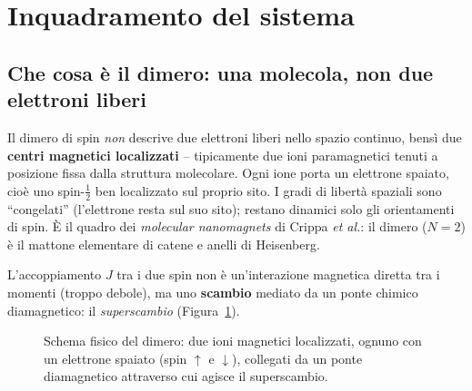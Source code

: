 \documentclass[11pt,a4paper]{article}
\newcommand{\up}{\uparrow}
\newcommand{\dn}{\downarrow}
\theoremstyle{definition}
\theoremstyle{remark}
\newcommand{\arrowup}[2]{\draw[spinup,line width=1.2pt,-{Stealth[length=2.4mm,width=2mm]}] (#1,{#2-0.22}) -- (#1,{#2+0.24});}
\newcommand{\arrowdn}[2]{\draw[spindown,line width=1.2pt,-{Stealth[length=2.4mm,width=2mm]}] (#1,{#2+0.22}) -- (#1,{#2-0.24});}
\begin{document}
\section{Inquadramento del sistema}

\subsection{Che cosa è il dimero: una molecola, non due elettroni liberi}

Il dimero di spin \emph{non} descrive due elettroni liberi nello spazio continuo, bensì due
\textbf{centri magnetici localizzati} -- tipicamente due ioni paramagnetici tenuti a posizione fissa
dalla struttura molecolare. Ogni ione porta un elettrone spaiato, cioè uno spin-$\tfrac12$ ben
localizzato sul proprio sito. I gradi di libertà spaziali sono ``congelati'' (l'elettrone resta sul suo
sito); restano dinamici solo gli orientamenti di spin. È il quadro dei \emph{molecular nanomagnets} di
Crippa \textit{et al.}: il dimero ($N=2$) è il mattone elementare di catene e anelli di Heisenberg.

L'accoppiamento $J$ tra i due spin non è un'interazione magnetica diretta tra i momenti (troppo
debole), ma uno \textbf{scambio} mediato da un ponte chimico diamagnetico: il \emph{superscambio}
(Figura~\ref{fig:molecola}).

\begin{figure}[htbp]
\centering
{}
\caption{Schema fisico del dimero: due ioni magnetici localizzati, ognuno con un elettrone spaiato
(spin $\up$ e $\dn$), collegati da un ponte diamagnetico attraverso cui agisce il superscambio.}
\label{fig:molecola}
\end{figure}
\end{document}
